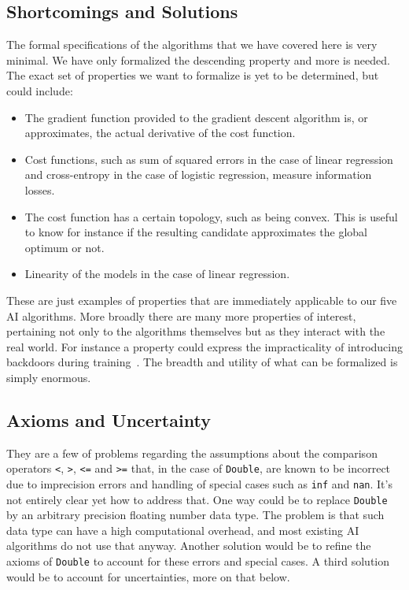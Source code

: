 \documentclass[]{report}
\begin{document}
\subsection{Shortcomings and Solutions}
The formal specifications of the algorithms that we have covered here
is very minimal.  We have only formalized the descending property and
more is needed.  The exact set of properties we want to formalize is
yet to be determined, but could include:
\begin{itemize}
\item The gradient function provided to the gradient descent algorithm
  is, or approximates, the actual derivative of the cost function.
\item Cost functions, such as sum of squared errors in the case of
  linear regression and cross-entropy in the case of logistic
  regression, measure information losses.
\item The cost function has a certain topology, such as being convex.
  This is useful to know for instance if the resulting candidate
  approximates the global optimum or not.
\item Linearity of the models in the case of linear regression.
\end{itemize}
These are just examples of properties that are immediately applicable
to our five AI algorithms.  More broadly there are many more
properties of interest, pertaining not only to the algorithms
themselves but as they interact with the real world.  For instance a
property could express the impracticality of introducing backdoors
during training~\cite{Menisov2022}.  The breadth and utility of what
can be formalized is simply enormous.

\subsection{Axioms and Uncertainty}
They are a few of problems regarding the assumptions about the
comparison operators \texttt{<}, \texttt{>}, \texttt{<=} and
\texttt{>=} that, in the case of \texttt{Double}, are known to be
incorrect due to imprecision errors and handling of special cases such
as \texttt{inf} and \texttt{nan}.  It's not entirely clear yet how to
address that.  One way could be to replace \texttt{Double} by an
arbitrary precision floating number data type.  The problem is that
such data type can have a high computational overhead, and most
existing AI algorithms do not use that anyway.  Another solution would
be to refine the axioms of \texttt{Double} to account for these errors
and special cases.  A third solution would be to account for
uncertainties, more on that below.
\end{document}
